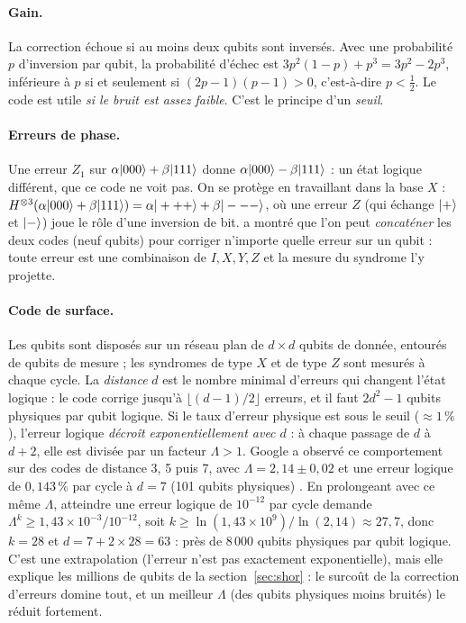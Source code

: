 \paragraph{Gain.} La correction échoue si au moins deux qubits sont inversés. Avec une probabilité $p$ d'inversion par
qubit, la probabilité d'échec est $3p^2(1-p)+p^3=3p^2-2p^3$, inférieure à $p$ si et seulement si $(2p-1)(p-1)>0$,
c'est-à-dire $p<\frac12$. Le code est utile \emph{si le bruit est assez faible}. C'est le principe d'un
\emph{seuil}.

\paragraph{Erreurs de phase.} Une erreur $Z_1$ sur $\alpha|000\rangle+\beta|111\rangle$ donne $\alpha|000\rangle-\beta|111\rangle$ : un état
logique différent, que ce code ne voit pas. On se protège en travaillant dans la base $X$ : $H^{\otimes3}(\alpha|000\rangle+\beta|111\rangle)
=\alpha|+++\rangle+\beta|---\rangle$, où une erreur $Z$ (qui échange $|+\rangle$ et $|-\rangle$) joue le rôle d'une inversion de
bit. \textcite{shor1995} a montré que l'on peut \emph{concaténer} les deux codes (neuf qubits) pour corriger n'importe quelle erreur sur un
qubit : toute erreur est une combinaison de $I,X,Y,Z$ et la mesure du syndrome l'y projette.

\paragraph{Code de surface.} Les qubits sont disposés sur un réseau plan de $d\times d$ qubits de donnée, entourés de qubits
de mesure ; les syndromes de type $X$ et de type $Z$ sont mesurés à chaque cycle. La \emph{distance} $d$ est le nombre minimal
d'erreurs qui changent l'état logique : le code corrige jusqu'à $\lfloor(d-1)/2\rfloor$ erreurs, et il faut
$2d^2-1$ qubits physiques par qubit logique. Si le taux d'erreur physique est sous le seuil ($\approx1\,\%$), l'erreur
logique \emph{décroît exponentiellement avec $d$} : à chaque passage de $d$ à $d+2$, elle est divisée par un
facteur $\Lambda>1$. Google a observé ce comportement sur des codes de distance 3, 5 puis 7, avec
$\Lambda=2{,}14\pm0{,}02$ et une erreur logique de $0{,}143\,\%$ par cycle à $d=7$ (101 qubits physiques)
\parencite{acharya2025}. En prolongeant avec ce même $\Lambda$, atteindre une erreur logique de $10^{-12}$ par cycle demande
$\Lambda^{k}\geq1{,}43\times10^{-3}/10^{-12}$, soit $k\geq\ln(1{,}43\times10^{9})/\ln(2{,}14)\approx27{,}7$, donc
$k=28$ et $d=7+2\times28=63$ : près de $8\,000$ qubits physiques par qubit logique. C'est une extrapolation (l'erreur n'est pas
exactement exponentielle), mais elle explique les millions de qubits de la section~\ref{sec:shor} : le surcoût de la
correction d'erreurs domine tout, et un meilleur $\Lambda$ (des qubits physiques moins bruités) le réduit fortement.

